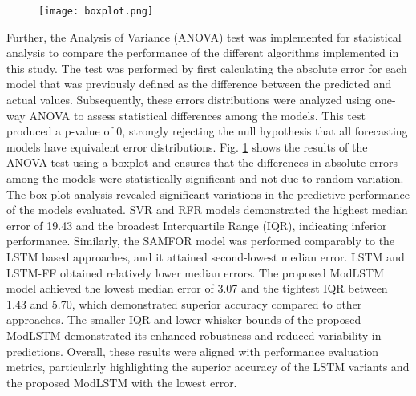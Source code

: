 \documentclass[journal]{IEEEtran}
\begin{document}
\begin{figure}[!h]
		\centering
\texttt{[image: boxplot.png]}
		\caption{ }
		\label{Boxplot}
	\end{figure}


Further, the Analysis of Variance (ANOVA) test was implemented for statistical analysis to compare the performance of the different algorithms implemented in this study. The test was performed by first calculating the absolute error for each model that was previously defined as the difference between the predicted and actual values.  Subsequently, these errors distributions were analyzed using one-way ANOVA to assess statistical differences among the models. This test produced a p-value of 0, strongly rejecting the null hypothesis that all forecasting models have equivalent error distributions. 
Fig. \ref{Boxplot} shows the results of the ANOVA test using a boxplot and ensures that the differences in absolute errors among the models were statistically significant and not due to random variation. The box plot analysis revealed significant variations in the predictive performance of the models evaluated. SVR and RFR models demonstrated the highest median error of 19.43 and the broadest Interquartile Range (IQR), indicating inferior performance. Similarly, the SAMFOR model was performed comparably to the LSTM based approaches, and it attained second-lowest median error. LSTM and LSTM-FF obtained relatively lower median errors. The proposed ModLSTM model achieved the lowest median error of 3.07 and the tightest IQR between 1.43 and 5.70, which demonstrated superior accuracy compared to other approaches. The smaller IQR and lower whisker bounds of the proposed ModLSTM demonstrated its enhanced robustness and reduced variability in predictions.
 Overall, these results were aligned with performance evaluation metrics, particularly highlighting the superior accuracy of the LSTM variants and the proposed ModLSTM with the lowest error.
\end{document}
